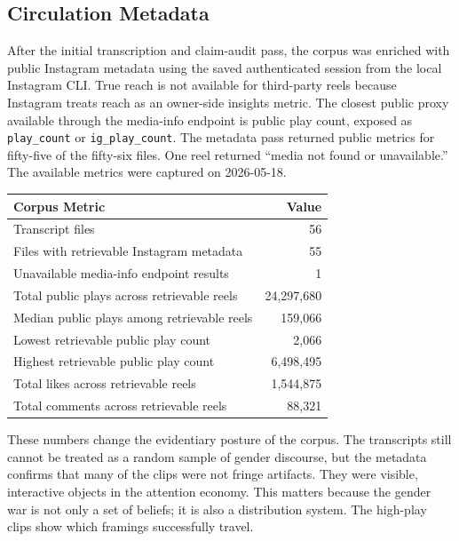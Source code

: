 \documentclass[12pt]{article}
\begin{document}
\subsection{Circulation Metadata}

After the initial transcription and claim-audit pass, the corpus was enriched with public Instagram metadata using the saved authenticated session from the local Instagram CLI. True reach is not available for third-party reels because Instagram treats reach as an owner-side insights metric. The closest public proxy available through the media-info endpoint is public play count, exposed as \texttt{play\_count} or \texttt{ig\_play\_count}. The metadata pass returned public metrics for fifty-five of the fifty-six files. One reel returned ``media not found or unavailable.'' The available metrics were captured on 2026-05-18.

\begin{longtable}{p{} r}
\toprule
\textbf{Corpus Metric} & \textbf{Value} \\
\midrule
\endhead
Transcript files & 56 \\
Files with retrievable Instagram metadata & 55 \\
Unavailable media-info endpoint results & 1 \\
Total public plays across retrievable reels & 24,297,680 \\
Median public plays among retrievable reels & 159,066 \\
Lowest retrievable public play count & 2,066 \\
Highest retrievable public play count & 6,498,495 \\
Total likes across retrievable reels & 1,544,875 \\
Total comments across retrievable reels & 88,321 \\
\bottomrule
\end{longtable}

These numbers change the evidentiary posture of the corpus. The transcripts still cannot be treated as a random sample of gender discourse, but the metadata confirms that many of the clips were not fringe artifacts. They were visible, interactive objects in the attention economy. This matters because the gender war is not only a set of beliefs; it is also a distribution system. The high-play clips show which framings successfully travel.
\end{document}
